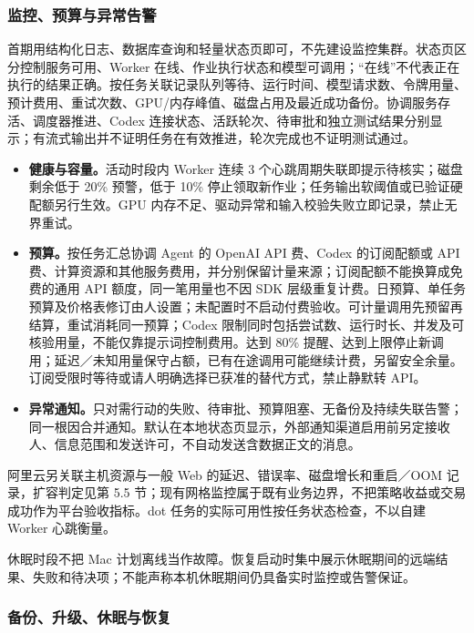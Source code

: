 \documentclass[11pt,a4paper]{article}
\begin{document}
\subsubsection{监控、预算与异常告警}

首期用结构化日志、数据库查询和轻量状态页即可，不先建设监控集群。状态页区分控制服务可用、Worker 在线、作业执行状态和模型可调用；“在线”不代表正在执行的结果正确。按任务关联记录队列等待、运行时间、模型请求数、令牌用量、预计费用、重试次数、GPU/内存峰值、磁盘占用及最近成功备份。协调服务存活、调度器推进、Codex 连接状态、活跃轮次、待审批和独立测试结果分别显示；有流式输出并不证明任务在有效推进，轮次完成也不证明测试通过。

\begin{itemize}[leftmargin=2em,itemsep=3pt]
  \item \textbf{健康与容量。}活动时段内 Worker 连续 3 个心跳周期失联即提示待核实；磁盘剩余低于 20\% 预警，低于 10\% 停止领取新作业；任务输出软阈值或已验证硬配额另行生效。GPU 内存不足、驱动异常和输入校验失败立即记录，禁止无界重试。
  \item \textbf{预算。}按任务汇总协调 Agent 的 OpenAI API 费、Codex 的订阅配额或 API 费、计算资源和其他服务费用，并分别保留计量来源；订阅配额不能换算成免费的通用 API 额度，同一笔用量也不因 SDK 层级重复计费。日预算、单任务预算及价格表修订由人设置；未配置时不启动付费验收。可计量调用先预留再结算，重试消耗同一预算；Codex 限制同时包括尝试数、运行时长、并发及可核验用量，不能仅靠提示词控制费用。达到 80\% 提醒、达到上限停止新调用；延迟／未知用量保守占额，已有在途调用可能继续计费，另留安全余量。订阅受限时等待或请人明确选择已获准的替代方式，禁止静默转 API。
  \item \textbf{异常通知。}只对需行动的失败、待审批、预算阻塞、无备份及持续失联告警；同一根因合并通知。默认在本地状态页显示，外部通知渠道启用前另定接收人、信息范围和发送许可，不自动发送含数据正文的消息。
\end{itemize}

阿里云另关联主机资源与一般 Web 的延迟、错误率、磁盘增长和重启／OOM 记录，扩容判定见第 5.5 节；现有网格监控属于既有业务边界，不把策略收益或交易成功作为平台验收指标。dot 任务的实际可用性按任务状态检查，不以自建 Worker 心跳衡量。

休眠时段不把 Mac 计划离线当作故障。恢复启动时集中展示休眠期间的远端结果、失败和待决项；不能声称本机休眠期间仍具备实时监控或告警保证。

\subsubsection{备份、升级、休眠与恢复}
\end{document}
